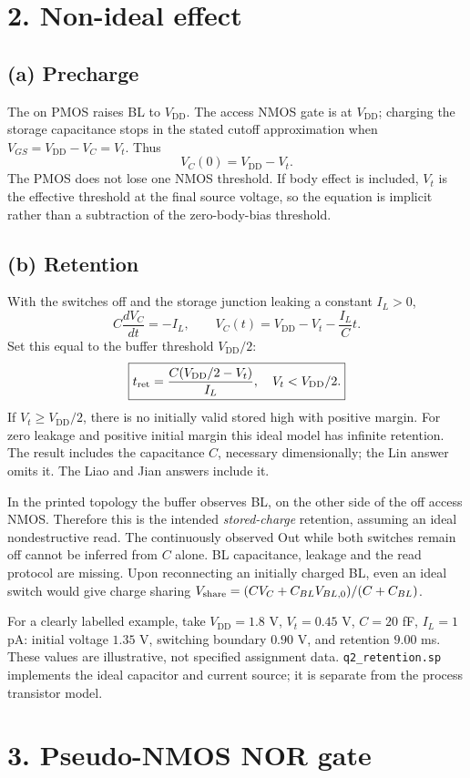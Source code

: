 \documentclass[11pt,a4paper]{article}
\newcommand{\VDD}{V_{\mathrm{DD}}}
\begin{document}
\section*{2. Non-ideal effect}
\subsection*{(a) Precharge}
The on PMOS raises BL to $\VDD$. The access NMOS gate is at $\VDD$;
charging the storage capacitance stops in the stated cutoff approximation
when $V_{GS}=\VDD-V_C=V_t$. Thus
\[
 \boxed{V_C(0)=\VDD-V_t.}
\]
The PMOS does not lose one NMOS threshold. If body effect is included,
$V_t$ is the effective threshold at the final source voltage, so the equation
is implicit rather than a subtraction of the zero-body-bias threshold.
\subsection*{(b) Retention}
With the switches off and the storage junction leaking a constant $I_L>0$,
\[
 C\frac{dV_C}{dt}=-I_L,\qquad
 V_C(t)=\VDD-V_t-\frac{I_L}{C}t.
\]
Set this equal to the buffer threshold $\VDD/2$:
\[
 \boxed{t_{\rm ret}=\frac{C(\VDD/2-V_t)}{I_L},\quad V_t<\VDD/2.}
\]
If $V_t\geq\VDD/2$, there is no initially valid stored high with positive
margin. For zero leakage and positive initial margin this ideal model has
infinite retention. The result includes the capacitance $C$, necessary
dimensionally; the Lin answer omits it. The Liao and Jian answers include it.

In the printed topology the buffer observes BL, on the other side of the
off access NMOS. Therefore this is the intended \emph{stored-charge}
retention, assuming an ideal nondestructive read. The continuously observed
Out while both switches remain off cannot be inferred from $C$ alone.
BL capacitance, leakage and the read protocol are missing. Upon reconnecting
an initially charged BL, even an ideal switch would give charge sharing
$V_{\rm share}=(CV_C+C_{BL}V_{BL,0})/(C+C_{BL})$.

For a clearly labelled example, take $\VDD=1.8$ V, $V_t=0.45$ V,
$C=20$ fF, $I_L=1$ pA: initial voltage $1.35$ V, switching boundary
$0.90$ V, and retention $9.00$ ms. These values are illustrative, not specified
assignment data. \texttt{q2\_retention.sp} implements the ideal capacitor
and current source; it is separate from the process transistor model.

\section*{3. Pseudo-NMOS NOR gate}
\end{document}
